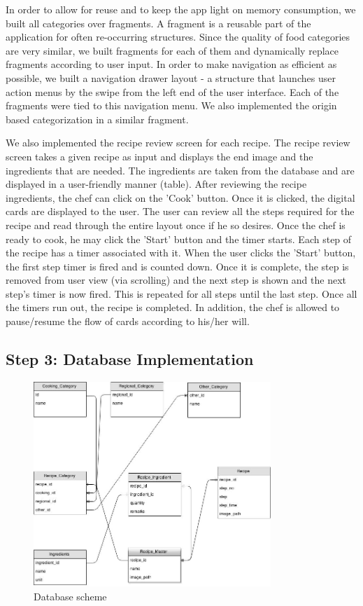 In order to allow for reuse and to keep the app light on memory consumption, we built all categories over fragments.
A fragment is a reusable part of the application for often re-occurring structures. 
Since the quality of food categories are very similar, we built fragments for each of them and dynamically replace fragments according to user input. 
In order to make navigation as efficient as possible, we built a navigation drawer layout - a structure that launches user action menus by the swipe from the left end of the user interface.
Each of the fragments were tied to this navigation menu.
We also implemented the origin based categorization in a similar fragment.

We also implemented the recipe review screen for each recipe. 
The recipe review screen takes a given recipe as input and displays the end image and the ingredients that are needed. 
The ingredients are taken from the database and are displayed in a user-friendly manner (table).
After reviewing the recipe ingredients, the chef can click on the 'Cook' button. 
Once it is clicked, the digital cards are displayed to the user.
The user can review all the steps required for the recipe and read through the entire layout once if he so desires.
Once the chef is ready to cook, he may click the 'Start' button and the timer starts.
Each step of the recipe has a timer associated with it. When the user clicks the 'Start' button, the first step timer is fired and is counted down. Once it is complete, the step is removed from user view (via scrolling) and the next step is shown and the next step's timer is now fired. 
This is repeated for all steps until the last step. Once all the timers run out, the recipe is completed. In addition, the chef is allowed to pause/resume the flow of cards according to his/her will.

\subsection{Step 3: Database Implementation}

\begin{figure}[ht!]
	\centering
	\includegraphics[width=0.8\textwidth, height=0.4\textheight]{images/db.jpg}
	\caption{Database scheme \label{db-schema}}
\end{figure}

